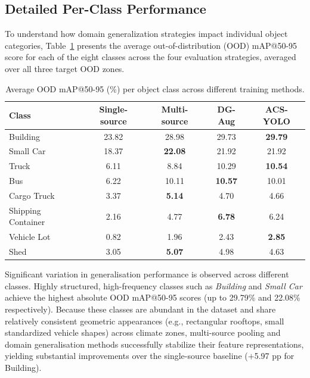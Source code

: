 \documentclass[12pt,a4paper]{article}
\begin{document}
\subsection{Detailed Per-Class Performance}
\label{subsec:per_class_performance}

To understand how domain generalization strategies impact individual object categories, Table~\ref{tab:per_class_ood} presents the average out-of-distribution (OOD) mAP@50-95 score for each of the eight classes across the four evaluation strategies, averaged over all three target OOD zones.

\begin{table}[H]
\centering
\caption{Average OOD mAP@50-95 (\%) per object class across different training methods.}
\label{tab:per_class_ood}
\small
\begin{tabular}{lcccc}
\toprule
\textbf{Class} & \textbf{Single-source} & \textbf{Multi-source} & \textbf{DG-Aug} & \textbf{ACS-YOLO} \\
\midrule
Building           & 23.82 & 28.98 & 29.73 & \textbf{29.79} \\
Small Car          & 18.37 & \textbf{22.08} & 21.92 & 21.92 \\
Truck              &  6.11 &  8.84 & 10.29 & \textbf{10.54} \\
Bus                &  6.22 & 10.11 & \textbf{10.57} & 10.01 \\
Cargo Truck        &  3.37 &  \textbf{5.14} &  4.70 &  4.66 \\
Shipping Container &  2.16 &  4.77 &  \textbf{6.78} &  6.24 \\
Vehicle Lot        &  0.82 &  1.96 &  2.43 &  \textbf{2.85} \\
Shed               &  3.05 &  \textbf{5.07} &  4.98 &  4.63 \\
\bottomrule
\end{tabular}
\end{table}

Significant variation in generalisation performance is observed across different classes. Highly structured, high-frequency classes such as \textit{Building} and \textit{Small Car} achieve the highest absolute OOD mAP@50-95 scores (up to 29.79\% and 22.08\% respectively). Because these classes are abundant in the dataset and share relatively consistent geometric appearances (e.g., rectangular rooftops, small standardized vehicle shapes) across climate zones, multi-source pooling and domain generalisation methods successfully stabilize their feature representations, yielding substantial improvements over the single-source baseline ($+$5.97 pp for Building).
\end{document}
